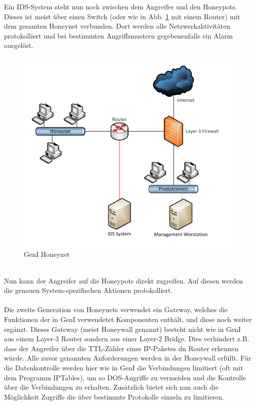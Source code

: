 Ein IDS-System steht nun noch zwischen dem Angreifer und den Honeypots. Dieses ist meist über einen Switch (oder wie in Abb. \ref{hnet:geni} mit einem Router) mit dem gesamten Honeynet verbunden. Dort werden alle Netzwerkaktivitäten protokolliert und bei bestimmten Angriffsmustern gegebenenfalls ein Alarm ausgelöst. 
\\
\begin{figure}[ht]
    \centering\includegraphics[scale=0.5]{Bilder/GenI.pdf}
  \caption{GenI Honeynet}
  \label{hnet:geni}
\end{figure}
\\
Nun kann der Angreifer auf die Honeypots direkt zugreifen. Auf diesen werden die genauen System-spezifischen Aktionen protokolliert.\\
\\
Die zweite Generation von Honeynets verwendet ein Gateway, welches die Funktionen der in GenI verwendetet Komponenten enthält, und diese noch weiter ergänzt. Dieses Gateway (meist Honeywall genannt) besteht nicht wie in GenI aus einem Layer-3 Router sondern aus einer Layer-2 Bridge. Dies verhindert z.B. dass der Angreifer über die TTL-Zähler eines IP-Paketes dn Router erkennen würde. Alle zuvor genannten Anforderungen werden in der Honeywall erfüllt. Für die Datenkontrolle werden hier wie in GenI die Verbindungen limitiert (oft mit dem Programm IPTables), um so DOS-Angriffe zu vermeiden und die Kontrolle über die Verbindungen zu erhalten. Zusätzlich bietet sich nun auch die Möglichkeit Zugriffe die über bestimmte Protokolle einzeln zu limitieren.

